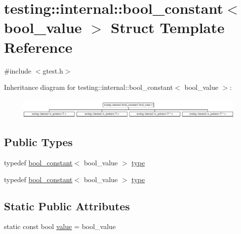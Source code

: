 \hypertarget{structtesting_1_1internal_1_1bool__constant}{\section{testing\-:\-:internal\-:\-:bool\-\_\-constant$<$ bool\-\_\-value $>$ Struct Template Reference}
\label{structtesting_1_1internal_1_1bool__constant}
}


{\ttfamily \#include $<$gtest.\-h$>$}

Inheritance diagram for testing\-:\-:internal\-:\-:bool\-\_\-constant$<$ bool\-\_\-value $>$\-:\begin{figure}[H]
\begin{center}
\leavevmode
\includegraphics[height=1.021898cm]{structtesting_1_1internal_1_1bool__constant}
\end{center}
\end{figure}
\subsection*{Public Types}
\begin{DoxyCompactItemize}
\item 
typedef \hyperlink{structtesting_1_1internal_1_1bool__constant}{bool\-\_\-constant}$<$ bool\-\_\-value $>$ \hyperlink{structtesting_1_1internal_1_1bool__constant_aba6d09ecf7eecea6c93480f0d627a167}{type}
\item 
typedef \hyperlink{structtesting_1_1internal_1_1bool__constant}{bool\-\_\-constant}$<$ bool\-\_\-value $>$ \hyperlink{structtesting_1_1internal_1_1bool__constant_aba6d09ecf7eecea6c93480f0d627a167}{type}
\end{DoxyCompactItemize}
\subsection*{Static Public Attributes}
\begin{DoxyCompactItemize}
\item 
static const bool \hyperlink{structtesting_1_1internal_1_1bool__constant_a499fba6576296b04d99690a486424b32}{value} = bool\-\_\-value
\end{DoxyCompactItemize}


